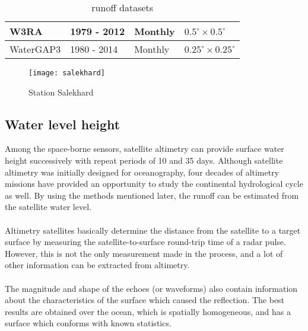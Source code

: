 \begin{table}[htbp]
\begin{tabular}{llll}
		\multicolumn{1}{|l|}{W3RA}       & \multicolumn{1}{l|}{1979 - 2012} & \multicolumn{1}{l|}{Monthly}             & \multicolumn{1}{l|}{$0.5^{\circ} \times 0.5^{\circ}$}                      \\ \hline
		\multicolumn{1}{|l|}{WaterGAP3}       & \multicolumn{1}{l|}{1980 - 2014} & \multicolumn{1}{l|}{Monthly}             & \multicolumn{1}{l|}{$0.25^{\circ} \times 0.25^{\circ}$}                       \\ \hline
	\end{tabular}
	\caption{runoff datasets}
	\label{tab:runoff}
\end{table}
\begin{figure}[htbp]
	\centering
	\texttt{[image: salekhard]} %
	\caption{Station Salekhard} 
	\label{fig:Salekhard}
\end{figure}
\subsection{Water level height}
 Among the space-borne sensors, satellite altimetry can provide surface water height successively with repeat periods of 10 and 35 days. Although satellite altimetry was initially designed for oceanography, four decades of altimetry missions have provided an opportunity to study the continental hydrological cycle as well. By using the methods mentioned later, the runoff can be estimated from the satellite water level.\\\\
 Altimetry satellites basically determine the distance from the satellite to a target surface by measuring the satellite-to-surface round-trip time of a radar pulse. However, this is not the only measurement made in the process, and a lot of other information can be extracted from altimetry.\\\\
 The magnitude and shape of the echoes (or waveforms) also contain information about the characteristics of the surface which caused the reflection. The best results are obtained over the ocean, which is spatially homogeneous, and has a surface which conforms with known statistics.
